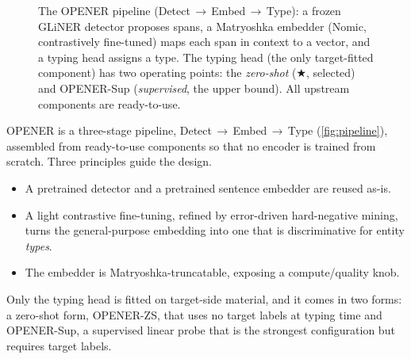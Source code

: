 \begin{figure}[H]
{{{%
}%
}}
\caption{The OPENER pipeline (Detect\,$\rightarrow$\,Embed\,$\rightarrow$\,Type): a frozen GLiNER detector proposes spans, a Matryoshka embedder (Nomic, contrastively fine-tuned) maps each span in context to a vector, and a typing head assigns a type. The typing head (the only target-fitted component) has two operating points: the \emph{zero-shot} \zstr ($\bigstar$, selected) and OPENER-Sup (\emph{supervised}, the upper bound). All upstream components are ready-to-use.}
\label{fig:pipeline}
\end{figure}

OPENER is a three-stage pipeline, Detect\,$\rightarrow$\,Embed\,$\rightarrow$\,Type (\autoref{fig:pipeline}), assembled from ready-to-use components so that no encoder is trained from scratch.
Three principles guide the design.
\begin{itemize}
\item A pretrained detector and a pretrained sentence embedder are reused as-is.
\item A light contrastive fine-tuning, refined by error-driven hard-negative mining, turns the general-purpose embedding into one that is discriminative for entity \emph{types}.
\item The embedder is Matryoshka-truncatable, exposing a compute/quality knob.
\end{itemize}
Only the typing head is fitted on target-side material, and it comes in two forms: a zero-shot form, OPENER-ZS, that uses no target labels at typing time and OPENER-Sup, a supervised linear probe that is the strongest configuration but requires target labels.


